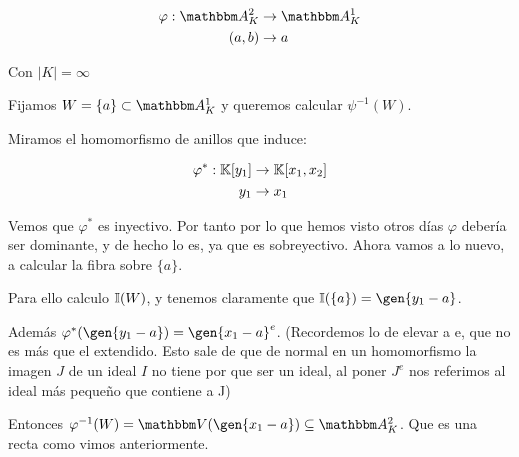 \begin{example}
	\begin{align*}
	\varphi: \A^2_K & \rightarrow \A^1_K \\
	(a,b) & \rightarrow a
	\end{align*}

	Con $|K|=\infty$

	Fijamos $W=\{a\} \subset \A_K^1$ y queremos calcular $\psi^{-1}(W)$.

	Miramos el homomorfismo de anillos que induce:

	\begin{align*}
	\varphi^*: \mathbb{K}[y_1] & \rightarrow \mathbb{K}[x_1,x_2] \\
	y_1 & \rightarrow x_1
	\end{align*}

	Vemos que $\varphi^*$ es inyectivo. Por tanto por lo que hemos visto otros días $\varphi$ debería ser dominante, y de hecho lo es, ya que es sobreyectivo. Ahora vamos a lo nuevo, a calcular la fibra sobre $\{a\}$.

	Para ello calculo $\mathbb{I}(W)$, y tenemos claramente que $\I(\{a\})=\gen{y_1 -a}$.
	
	Además $\varphi^*(\gen{y_1-a})=\gen{x_1-a}^e$. (Recordemos lo de elevar a e, que no es más que el extendido. Esto sale de que de normal en un homomorfismo la imagen $J$ de un ideal $I$ no tiene por que ser un ideal, al poner $J^e$ nos referimos al ideal más pequeño que contiene a J)
	

	Entonces $\varphi^{-1}(W)= \V(\gen{x_1-a}) \subseteq \A^2_K$. Que es una recta como vimos anteriormente.
\end{example}


